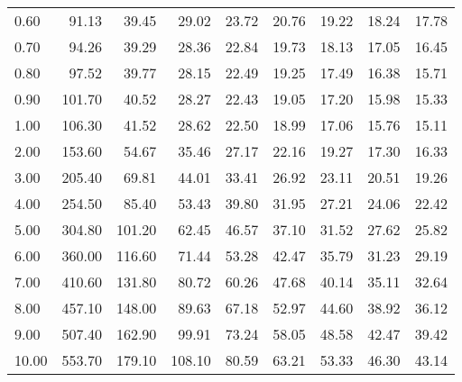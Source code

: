 \begin{tabular}{lrrrrrrrr}
0.60  &      91.13 &       39.45 &      29.02 &       23.72 &      20.76 &       19.22 &       18.24 &       17.78 \\
0.70  &      94.26 &       39.29 &      28.36 &       22.84 &      19.73 &       18.13 &       17.05 &       16.45 \\
0.80  &      97.52 &       39.77 &      28.15 &       22.49 &      19.25 &       17.49 &       16.38 &       15.71 \\
0.90  &     101.70 &       40.52 &      28.27 &       22.43 &      19.05 &       17.20 &       15.98 &       15.33 \\
1.00  &     106.30 &       41.52 &      28.62 &       22.50 &      18.99 &       17.06 &       15.76 &       15.11 \\
2.00  &     153.60 &       54.67 &      35.46 &       27.17 &      22.16 &       19.27 &       17.30 &       16.33 \\
3.00  &     205.40 &       69.81 &      44.01 &       33.41 &      26.92 &       23.11 &       20.51 &       19.26 \\
4.00  &     254.50 &       85.40 &      53.43 &       39.80 &      31.95 &       27.21 &       24.06 &       22.42 \\
5.00  &     304.80 &      101.20 &      62.45 &       46.57 &      37.10 &       31.52 &       27.62 &       25.82 \\
6.00  &     360.00 &      116.60 &      71.44 &       53.28 &      42.47 &       35.79 &       31.23 &       29.19 \\
7.00  &     410.60 &      131.80 &      80.72 &       60.26 &      47.68 &       40.14 &       35.11 &       32.64 \\
8.00  &     457.10 &      148.00 &      89.63 &       67.18 &      52.97 &       44.60 &       38.92 &       36.12 \\
9.00  &     507.40 &      162.90 &      99.91 &       73.24 &      58.05 &       48.58 &       42.47 &       39.42 \\
10.00 &     553.70 &      179.10 &     108.10 &       80.59 &      63.21 &       53.33 &       46.30 &       43.14 \\
\bottomrule
\end{tabular}
